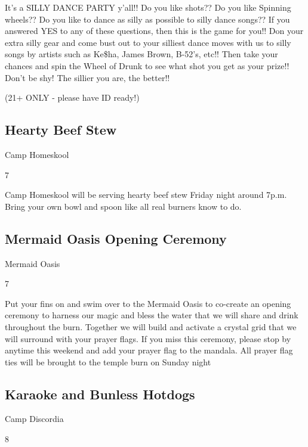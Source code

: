 \begin{multicols}{2}
It's a SILLY DANCE PARTY y'all!! Do you like shots?? Do you like Spinning wheels?? Do you like to dance as silly as possible to silly dance songs?? If you answered YES to any of these questions, then this is the game for you!! Don your extra silly gear and come bust out to your silliest dance moves with us to silly songs by artists such as Ke\$ha, James Brown, B-52's, etc!! Then take your chances and spin the Wheel of Drunk to see what shot you get as your prize!! Don't be shy! The sillier you are, the better!!  

(21+ ONLY - please have ID ready!)

\subsection*{Hearty Beef Stew}
\begin{description}[leftmargin=6em,noitemsep,style=nextline]
	\item[Camp:] Camp Homeskool
  \item[Times:] 7\pm
\end{description}

Camp Homeskool will be serving hearty beef stew Friday night around 7p.m.  Bring your own bowl and spoon like all real burners know to do.  

\subsection*{Mermaid Oasis Opening Ceremony}
\begin{description}[leftmargin=6em,noitemsep,style=nextline]
	\item[Camp:] Mermaid Oasis
  \item[Times:] 7\pm
\end{description}

Put your fins on and swim over to the Mermaid Oasis to co-create an opening ceremony to harness our magic and bless the water that we will share and drink throughout the burn. Together we will build and activate a crystal grid that we will surround with your prayer flags.  If you miss this ceremony, please stop by anytime this weekend and add your prayer flag to the mandala. All prayer flag ties will be brought to the temple burn on Sunday night

\subsection*{Karaoke and Bunless Hotdogs}
\begin{description}[leftmargin=6em,noitemsep,style=nextline]
	\item[Camp:] Camp Discordia
  \item[Times:] 8\pm
\end{description}


\end{multicols}
